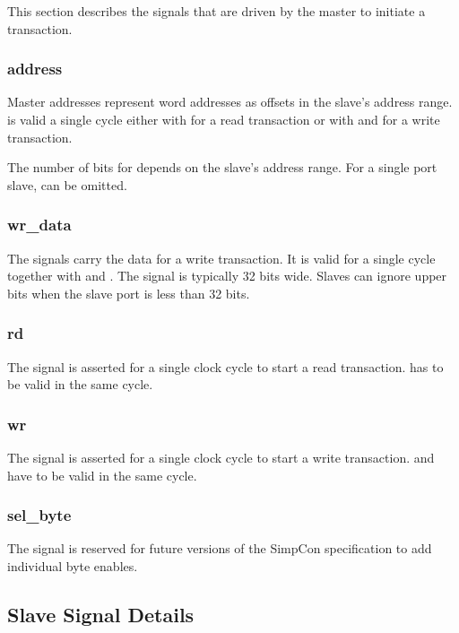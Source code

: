 This section describes the signals that are driven by the master to
initiate a transaction.

\subsubsection{address}

Master addresses represent word addresses as offsets in the slave's
address range.  is valid a single cycle either with
 for a read transaction or with  and
 for a write transaction.

The number of bits for  depends on the slave's address
range. For a single port slave,  can be omitted.

\subsubsection{wr\_data}

The  signals carry the data for a write transaction.
It is valid for a single cycle together with  and
. The signal is typically 32 bits wide. Slaves can ignore
upper bits when the slave port is less than 32 bits.

\subsubsection{rd}

The  signal is asserted for a single clock cycle to start a
read transaction.  has to be valid in the same cycle.

\subsubsection{wr}

The  signal is asserted for a single clock cycle to start a
write transaction.  and  have to be
valid in the same cycle.

\subsubsection{sel\_byte}

The  signal is reserved for future versions of the
SimpCon specification to add individual byte enables.

\subsection{Slave Signal Details}

